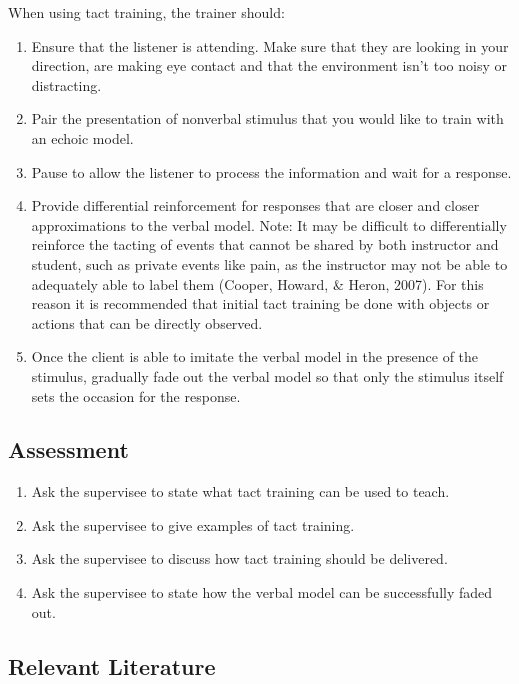 When using tact training, the trainer should:
\begin{enumerate}
\item Ensure that the listener is attending.  Make sure that they are looking in your direction, are making eye contact and that the environment isn't too noisy or distracting.
\item Pair the presentation of nonverbal stimulus that you would like to train with an echoic model.  
\item Pause to allow the listener to process the information and wait for a response.
\item Provide differential reinforcement for responses that are closer and closer approximations to the verbal model. Note:  It may be difficult to differentially reinforce the tacting of events that cannot be shared by both instructor and student, such as private events like pain, as the instructor may not be able to adequately able to label them (Cooper, Howard, \& Heron, 2007).  For this reason it is recommended that initial tact training be done with objects or actions that can be directly observed.
\item Once the client is able to imitate the verbal model in the presence of the stimulus, gradually fade out the verbal model so that only the stimulus itself sets the occasion for the response. 
\end{enumerate}
%
\subsection{Assessment}
\begin{enumerate}
\item Ask the supervisee to state what tact training can be used to teach.
\item Ask the supervisee to give examples of tact training.
\item Ask the supervisee to discuss how tact training should be delivered.
\item Ask the supervisee to state how the verbal model can be successfully faded out.
\end{enumerate}
%
\subsection{Relevant Literature}
\begin{refsection}
\nocite{skinner1957verbal,
    sundberg2001benefits,
    sundberg1998teaching}
\printbibliography[heading=none]
\end{refsection}
%
